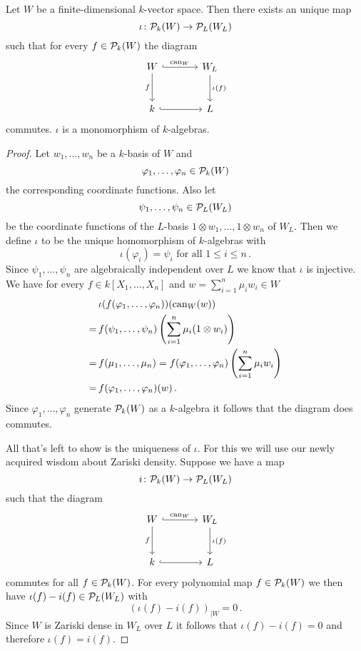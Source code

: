 \begin{lemma}
  Let $W$ be a finite-dimensional $k$-vector space. Then there exists an unique map
  \[
            \iota
    \colon  \mathcal{P}_k(W)
    \to     \mathcal{P}_L(W_L)
  \]
  such that for every $f \in \mathcal{P}_k(W)$ the diagram
  \[
    \begin{tikzcd}[sep = large]
        W
        \arrow[hook]{r}{\can_W}
        \arrow[swap]{d}{f}
      & W_L
        \arrow{d}{\iota(f)}
      \\
        k
        \arrow[hook]{r}
      & L
    \end{tikzcd}
  \]
  commutes.
  $\iota$ is a monomorphism of $k$-algebras.
\end{lemma}
\begin{proof}
  Let $w_1, \dotsc, w_n$ be a $k$-basis of $W$ and
  \[
        \varphi_1, \dotsc, \varphi_n
    \in \mathcal{P}_k(W)
  \]
  the corresponding coordinate functions. Also let
  \[
        \psi_1, \dotsc, \psi_n
    \in \mathcal{P}_L(W_L)
  \]
  be the coordinate functions of the $L$-basis $1 \otimes w_1, \dotsc, 1 \otimes w_n$ of $W_L$.
  Then we define $\iota$ to be the unique homomorphism of $k$-algebras with
  \[
      \iota(\varphi_i)
    = \psi_i
    \text{ for all }
    1 \leq i \leq n \,.
  \]
  Since $\psi_1, \dotsc, \psi_n$ are algebraically independent over $L$ we know that $\iota$ is injective.
  We have for every $f \in k[X_1, \dotsc, X_n]$ and $w = \sum_{i=1}^n \mu_i w_i \in W$
  \begin{align*}
     &\,  \iota(f(\varphi_1, \dotsc, \varphi_n))(\operatorname{can}_W(w)) \\
    =&\,  f(\psi_1, \dotsc, \psi_n)\left( \sum_{i=1}^n \mu_i (1 \otimes w_i) \right) \\
    =&\,  f(\mu_1, \dotsc, \mu_n)
     =    f(\varphi_1, \dotsc, \varphi_n)\left( \sum_{i=1}^n \mu_i w_i \right) \\
    =&\,  f(\varphi_1, \dotsc, \varphi_n)(w) \,.
  \end{align*}
  Since $\varphi_1, \dotsc, \varphi_n$ generate $\mathcal{P}_k(W)$ as a $k$-algebra it follows that the diagram does commutes.
  
  All that’s left to show is the uniqueness of $\iota$.
  For this we will use our newly acquired wisdom about Zariski density.
  Suppose we have a map
  \[
            i
    \colon  \mathcal{P}_k(W)
    \to     \mathcal{P}_L(W_L)
  \]
  such that the diagram
  \[
    \begin{tikzcd}[sep = large]
        W
        \arrow[hook]{r}{\can_W}
        \arrow[swap]{d}{f}
      & W_L
        \arrow{d}{\iota(f)}
      \\
        k
        \arrow[hook]{r}
      & L
    \end{tikzcd}
  \]
  commutes for all $f \in \mathcal{P}_k(W)$.
  For every polynomial map $f \in \mathcal{P}_k(W)$ we then have \mbox{$\iota(f)-i(f) \in \mathcal{P}_L(W_L)$} with
  \[
      \left(
        \iota(f)-i(f)
      \right)_{|W}
    = 0 \,.
  \]
  Since $W$ is Zariski dense in $W_L$ over $L$ it follows that $\iota(f) - i(f) = 0$ and therefore $\iota(f) = i(f)$.
\end{proof}


